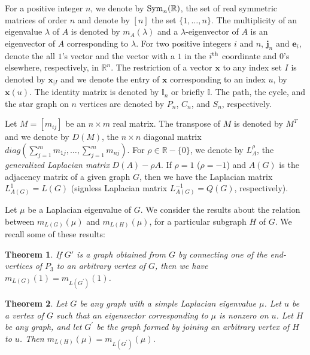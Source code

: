 \documentclass{amsart}
\newtheorem{theorem}{Theorem}
\theoremstyle{remark}
\begin{document}
For a positive integer $n$, we denote by $\text{\rm Sym}_{n}(\mathbb{R})$, the set of real symmetric matrices of order $n$ and denote by $[n]$ the set $\{1,\ldots,n\}$.
The multiplicity of an eigenvalue $\lambda$ of $A$ is denoted by $m_{A}(\lambda)$ and a $\lambda$-eigenvector of $A$ is an eigenvector of $A$ corresponding to $\lambda$.
For two positive integers $i$ and $n$, $\pmb{j}_{n}$ and $\pmb{e}_{i}$, denote the all $1$'s vector and the vector with a $1$ in the $i^{\rm th}$ coordinate and $0$'s elsewhere, respectively, in $\mathbb{R}^{n}$.
The restriction of a vector $\pmb{x}$ to any index set $I$ is denoted by $\pmb{x}_{| I}$ and we denote the entry of $\pmb{x}$ corresponding to an index $u$, by $\pmb{x}(u)$.
The identity matrix is denoted by $\mathbb{I}_{n}$  or briefly  $\mathbb{I}$.
The path, the cycle, and the star graph on $n$ vertices are denoted by $P_{n}$, $C_{n}$, and $S_{n}$, respectively.



Let $M=[m_{ij}]$ be an $n\times m$ real matrix. The transpose of $M$ is denoted by $M^{T}$ and we denote by $D(M)$, the $n\times n$ diagonal matrix $diag(\sum_{j=1}^{m}m_{1j},\ldots,\sum_{j=1}^{m}m_{nj})$. For $\rho\in \mathbb{R}-\{0\}$, we denote by $L_{A}^{\rho}$, the \textit{generalized Laplacian matrix} $D(A)-\rho A$. If $\rho=1$ ($\rho=-1$) and $A(G)$ is the adjacency matrix  of a given graph $G$, then we have the Laplacian matrix $L_{A(G)}^{1}=L(G)$ (signless Laplacian matrix $L_{A(G)}^{-1}=Q(G)$, respectively).

Let $\mu$ be a Laplacian eigenvalue of $G$. We consider the results about the relation between $m_{L(G)}(\mu)$ and $m_{L(H)}(\mu)$, for a particular subgraph $H$ of $G$. 
We recall some of these results:



\begin{theorem}{\rm \cite{GMS}}\label{delp3}
If $G'$ is a graph obtained from $G$ by connecting one of the end-vertices of $P_{3}$ to an arbitrary vertex of $G$, then we have $m_{L(G)}(1) =m_{L(G^{\prime})}(1)$.
\end{theorem}



\begin{theorem}{\rm \cite{Ne}}
Let  $G$  be  any graph  with a simple  Laplacian eigenvalue $\mu$.  Let  $u$ be 
a vertex of $G$  such that an eigenvector corresponding to $\mu$  is nonzero on $u$. 
Let $H$ be  any graph,  and  let $G^{\prime}$ be the graph formed  by joining  an arbitrary 
vertex of  $H$ to $u$.  Then $m_{L(H)}(\mu)=m_{L(G^{\prime})}(\mu)$.
\end{theorem}
\end{document}
